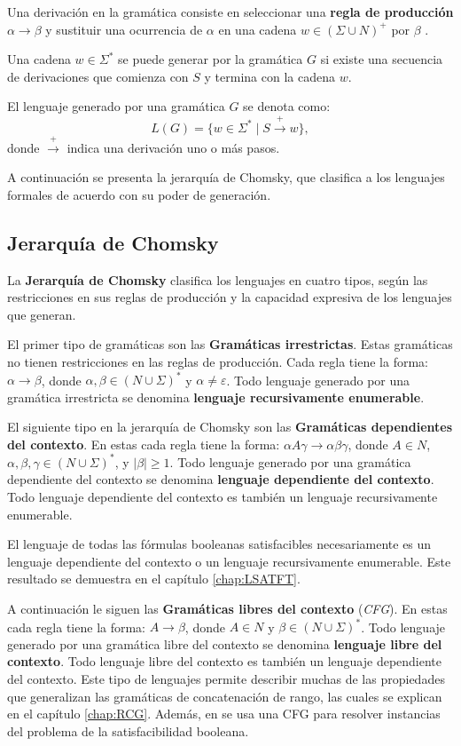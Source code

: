 \documentclass[12pt]{article}
\begin{document}
Una derivación en la gramática consiste en seleccionar una \textbf{regla de producción} $\alpha \to \beta$ y sustituir una ocurrencia de
$\alpha$ en una cadena $w\in (\Sigma \cup N)^+$ por $\beta$ \cite{authomataTheory}.

Una cadena $w\in\Sigma^*$  se puede generar por la gramática $G$ si existe una secuencia de derivaciones que comienza con $S$
y termina con la cadena $w$.

El lenguaje generado por una gramática \(G\) se denota como:
\[
  L(G) = \{ w \in \Sigma^* \mid S \overset{+}{\to} w \},
\]
donde \(\overset{+}{\to}\) indica una derivación uno o más pasos.

A continuación se presenta la jerarquía de Chomsky, que clasifica a los lenguajes formales de acuerdo con su poder de generación.

\subsection{Jerarquía de Chomsky}

La \textbf{Jerarquía de Chomsky} \cite{hunter2020chomsky} clasifica los lenguajes en cuatro tipos, según las restricciones en sus reglas de 
producción y la capacidad expresiva de los lenguajes que generan.

El primer tipo de gramáticas son las \textbf{Gramáticas irrestrictas}. Estas gramáticas no tienen restricciones en las reglas de producción.
Cada regla tiene la forma: \(\alpha \to \beta\), donde \(\alpha, \beta \in (N \cup \Sigma)^*\) y \(\alpha \neq \varepsilon\).
Todo lenguaje generado por una gramática irrestricta se denomina \textbf{lenguaje recursivamente enumerable}. 

El siguiente tipo en la jerarquía de Chomsky son las \textbf{Gramáticas dependientes del contexto}. En estas cada regla tiene la forma: \(\alpha A \gamma \to \alpha \beta \gamma\), donde \(A \in N\), \(\alpha, \beta, \gamma \in (N \cup \Sigma)^*\), y \(|\beta| \geq 1\).
Todo lenguaje generado por una gramática dependiente del contexto se denomina \textbf{lenguaje dependiente del contexto}.
Todo lenguaje dependiente del contexto es también un lenguaje recursivamente enumerable. 

El lenguaje de todas las fórmulas booleanas satisfacibles necesariamente es un lenguaje dependiente del contexto o un lenguaje
recursivamente enumerable. Este resultado se demuestra en el capítulo \ref{chap:LSATFT}.

A continuación le siguen las \textbf{Gramáticas libres del contexto} (\textit{CFG}). En estas cada regla tiene la forma: \(A \to \beta\), donde \(A \in N\) y \(\beta \in (N \cup \Sigma)^*\).
Todo lenguaje generado por una gramática libre del contexto se denomina \textbf{lenguaje libre del contexto}.
Todo lenguaje libre del contexto es también un lenguaje dependiente del contexto. Este tipo de lenguajes permite describir 
muchas de las propiedades que generalizan las gramáticas de concatenación de rango, las cuales se explican en el capítulo
\ref{chap:RCG}. Además, en \cite{aCFSAT} se usa una CFG para resolver instancias del problema de la satisfacibilidad booleana.
\end{document}
